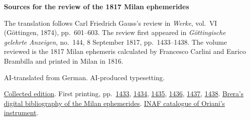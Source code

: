 \clearpage\thispagestyle{empty}
\begin{center}\Large\bfseries Sources for the review of the 1817 Milan ephemerides\end{center}

The translation follows Carl Friedrich Gauss’s review in \emph{Werke}, vol.~VI (Göttingen, 1874), pp.~601--603. The review first appeared in \emph{Göttingische gelehrte Anzeigen}, no.~144, 8 September 1817, pp.~1433--1438. The volume reviewed is the 1817 Milan ephemeris calculated by Francesco Carlini and Enrico Brambilla and printed in Milan in 1816.

AI-translated from German. AI-produced typesetting.

\href{https://gdz.sub.uni-goettingen.de/id/PPN236007467}{Collected edition}. First printing, pp.~\href{https://images.p.sub.uni-goettingen.de/iiif/image/gdz:PPN319721507_1817:00001447/full/1650,/0/default.jpg}{1433}, \href{https://images.p.sub.uni-goettingen.de/iiif/image/gdz:PPN319721507_1817:00001448/full/1650,/0/default.jpg}{1434}, \href{https://images.p.sub.uni-goettingen.de/iiif/image/gdz:PPN319721507_1817:00001449/full/1650,/0/default.jpg}{1435}, \href{https://images.p.sub.uni-goettingen.de/iiif/image/gdz:PPN319721507_1817:00001450/full/1650,/0/default.jpg}{1436}, \href{https://images.p.sub.uni-goettingen.de/iiif/image/gdz:PPN319721507_1817:00001451/full/1650,/0/default.jpg}{1437}, \href{https://images.p.sub.uni-goettingen.de/iiif/image/gdz:PPN319721507_1817:00001452/full/1650,/0/default.jpg}{1438}. \href{https://www1.brera.inaf.it/~mario.carpino/Biblioteca_Digitale/Effemeridi_Milano/}{Brera’s digital bibliography of the Milan ephemerides}. \href{https://www.beniculturali.inaf.it/opac/pst-iccd/circolo-moltiplicatore_13070}{INAF catalogue of Oriani’s instrument}.

\clearpage
